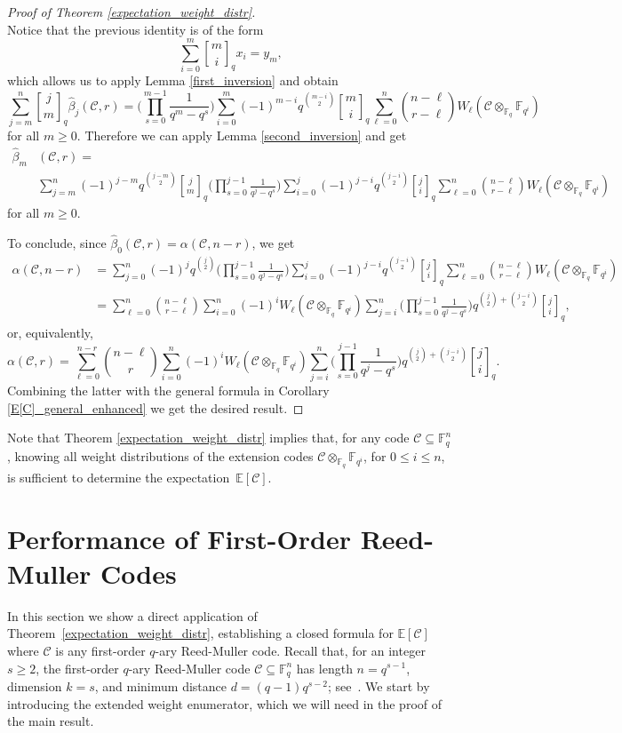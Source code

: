 \documentclass[11pt,a4paper,reqno,twoside]{article}
\theoremstyle{definition}
\newcommand{\F}{\mathbb{F}}
\newcommand{\E}{\mathbb{E}}
\newcommand{\mC}{\mathcal{C}}
\newcommand{\qbinom}[2]{\genfrac{[}{]}{0pt}{}{#1}{#2}}
\begin{document}
\begin{proof}[Proof of Theorem \ref{expectation_weight_distr}]
\[\]
Notice that the previous identity is of the form
\[
\sum_{i=0}^m \qbinom{m}{i}_q x_i = y_m,
\]
which allows us to apply Lemma \ref{first_inversion} and obtain
\[
\sum_{j=m}^n  \qbinom{j}{m}_q    \widehat{\beta}_j(\mC,r) = \Bigg(\prod_{s=0}^{m-1} \frac{1}{q^m - q^s}\Bigg)\sum_{i=0}^m (-1)^{m-i} q^{\binom{m-i}{2}} \qbinom{m}{i}_q \sum_{\ell=0}^n \binom{n-\ell}{r - \ell}  W_{\ell}(\mC \otimes_{\F_q} \F_{q^i})
\]
for all $m \ge 0$. Therefore we can apply Lemma \ref{second_inversion} and get
\[
\begin{split}
    \widehat{\beta}_m&(\mC,r) = \\ &\sum_{j=m}^n (-1)^{j-m} q^{\binom{j-m}{2}} \qbinom{j}{m}_q \Bigg( \prod_{s=0}^{j-1} \frac{1}{q^j - q^s} \Bigg) \sum_{i=0}^j (-1)^{j-i} q^{\binom{j-i}{2}} \qbinom{j}{i}_q \sum_{\ell=0}^n \binom{n-\ell}{r - \ell}  W_{\ell}(\mC \otimes_{\F_q} \F_{q^i})
\end{split}
\]
for all $m \ge 0$.

To conclude, since $ \widehat{\beta}_0(\mC,r) = \alpha(\mC,n-r)$, we get 
\[
\begin{split}
    \alpha(\mC,n-r) &= \sum_{j=0}^n (-1)^{j} q^{\binom{j}{2}} \Bigg( \prod_{s=0}^{j-1} \frac{1}{q^j - q^s} \Bigg) \sum_{i=0}^j (-1)^{j-i} q^{\binom{j-i}{2}} \qbinom{j}{i}_q \sum_{\ell=0}^n \binom{n-\ell}{r - \ell}  W_{\ell}(\mC \otimes_{\F_q} \F_{q^i}) \\
    &= \sum_{\ell=0}^n \binom{n-\ell}{r - \ell} \sum_{i=0}^n (-1)^i W_{\ell}(\mC \otimes_{\F_q} \F_{q^i}) \sum_{j=i}^n \Bigg( \prod_{s=0}^{j-1} \frac{1}{q^j - q^s} \Bigg)  q^{\binom{j}{2} + \binom{j-i}{2}} \qbinom{j}{i}_q,
\end{split}
\]
or, equivalently,
\[
    \alpha(\mC,r)= \sum_{\ell=0}^{n-r}  \binom{n-\ell}{r}  \sum_{i=0}^n (-1)^i W_{\ell}(\mC \otimes_{\F_q} \F_{q^i}) \sum_{j=i}^n \Bigg( \prod_{s=0}^{j-1} \frac{1}{q^j - q^s} \Bigg) q^{\binom{j}{2} + \binom{j-i}{2}} \qbinom{j}{i}_q.
\]
Combining the latter with the general formula in Corollary \ref{E[C]_general_enhanced} we get the desired result.
\end{proof}


    Note that Theorem \ref{expectation_weight_distr} implies that, for any code $\mC \subseteq \F_q^n$, knowing all weight distributions of the extension codes $\mC \otimes_{\F_q} \F_{q^i}$, for $0 \le i \le n$, is sufficient to determine the expectation~$\E[\mC]$.

\section{Performance of First-Order Reed-Muller Codes} \label{reedmuller_section}
In this section we show a direct application of Theorem~\ref{expectation_weight_distr}, establishing a closed formula for 
$\E[\mC]$ where $\mC$ is any 
first-order $q$-ary Reed-Muller code.
Recall that, for an integer $s \ge 2$, the first-order $q$-ary Reed-Muller code $\mC \subseteq \F_q^n$ has length $n = q^{s-1}$, dimension $k=s$, and minimum distance $d = (q-1)q^{s-2}$; see~\cite[Definition~15]{jurrius2}.
We start by introducing the extended weight enumerator, which we will need in the proof of the main result.
\end{document}
